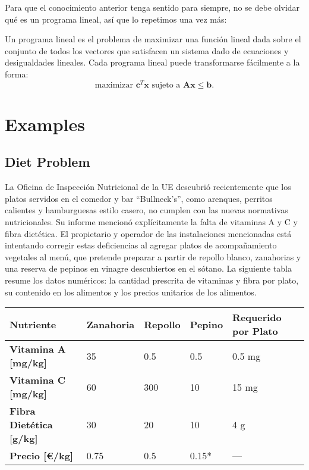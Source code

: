 \documentclass{article}
\begin{document}
Para que el conocimiento anterior tenga sentido para siempre, no se debe olvidar qué es un programa lineal, así que lo repetimos una vez más:


\begin{tcolorbox}[colback=white!10!white, colframe=black!75!black, title=Definición de Programa Lineal]
Un programa lineal es el problema de maximizar una función lineal dada sobre el conjunto de todos los vectores que satisfacen un sistema dado de ecuaciones y desigualdades lineales. Cada programa lineal puede transformarse fácilmente a la forma:
\[
\text{maximizar } \mathbf{c}^T \mathbf{x} \text{ sujeto a } \mathbf{A} \mathbf{x} \leq \mathbf{b}.
\]
\end{tcolorbox}

\newpage 
\section{Examples}
\subsection{Diet Problem}
La Oficina de Inspección Nutricional de la UE descubrió recientemente que los platos servidos en el comedor y bar ``Bullneck’s'', como arenques, perritos calientes y hamburguesas estilo casero, no cumplen con las nuevas normativas nutricionales. Su informe mencionó explícitamente la falta de vitaminas A y C y fibra dietética. El propietario y operador de las instalaciones mencionadas está intentando corregir estas deficiencias al agregar platos de acompañamiento vegetales al menú, que pretende preparar a partir de repollo blanco, zanahorias y una reserva de pepinos en vinagre descubiertos en el sótano. La siguiente tabla resume los datos numéricos: la cantidad prescrita de vitaminas y fibra por plato, su contenido en los alimentos y los precios unitarios de los alimentos.
\begin{table}[h]
\centering
\begin{tabularx}{\textwidth}{|l|X|X|X|X|}
\hline
\textbf{Nutriente} & \textbf{Zanahoria} & \textbf{Repollo} & \textbf{Pepino} & \textbf{Requerido por Plato} \\
\hline
\textbf{Vitamina A [mg/kg]} & 35 & 0.5 & 0.5 & 0.5 mg \\
\textbf{Vitamina C [mg/kg]} & 60 & 300 & 10 & 15 mg \\
\textbf{Fibra Dietética [g/kg]} & 30 & 20 & 10 & 4 g \\
\textbf{Precio [€/kg]} & 0.75 & 0.5 & 0.15* & — \\
\hline
\end{tabularx}
\label{tab:datos_nutricionales}
\end{table}
\end{document}
